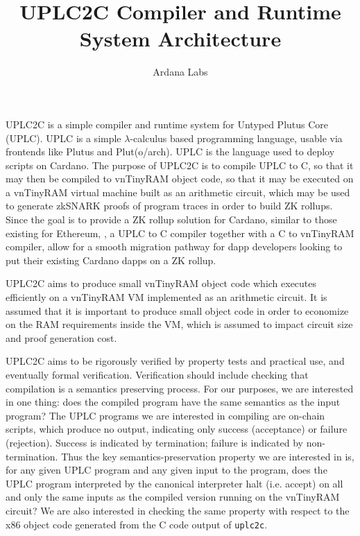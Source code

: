 \documentclass[12pt]{article}
\title{UPLC2C Compiler and Runtime System Architecture}
\author{Ardana Labs}
\begin{document}
\maketitle

UPLC2C is a simple compiler and runtime system for Untyped Plutus Core (UPLC). UPLC is a simple $\lambda$-calculus based programming language, usable via frontends like Plutus \cite{plutus} and Plut(o/arch). \cite{pluto,plutarch} UPLC is the language used to deploy scripts on Cardano. The purpose of UPLC2C is to compile UPLC to C, so that it may then be compiled to vnTinyRAM \cite{vntinyram} object code, so that it may be executed on a vnTinyRAM virtual machine built as an arithmetic circuit, which may be used to generate zkSNARK proofs of program traces in order to build ZK rollups. Since the goal is to provide a ZK rollup solution for Cardano, similar to those existing for Ethereum, \cite{ethworks-20}, a UPLC to C compiler together with a C to vnTinyRAM compiler, allow for a smooth migration pathway for dapp developers looking to put their existing Cardano dapps on a ZK rollup.

UPLC2C aims to produce small vnTinyRAM object code which executes efficiently on a vnTinyRAM VM implemented as an arithmetic circuit. It is assumed that it is important to produce small object code in order to economize on the RAM requirements inside the VM, which is assumed to impact circuit size and proof generation cost. 

UPLC2C aims to be rigorously verified by property tests and practical use, and eventually formal verification. Verification should include checking that compilation is a semantics preserving process. For our purposes, we are interested in one thing: does the compiled program have the same semantics as the input program? The UPLC programs we are interested in compiling are on-chain scripts, which produce no output, indicating only success (acceptance) or failure (rejection). Success is indicated by termination; failure is indicated by non-termination. Thus the key semantics-preservation property we are interested in is, for any given UPLC program and any given input to the program, does the UPLC program interpreted by the canonical interpreter halt (i.e. accept) on all and only the same inputs as the compiled version running on the vnTinyRAM circuit? We are also interested in checking the same property with respect to the x86 object code generated from the C code output of \texttt{uplc2c}.
\end{document}
